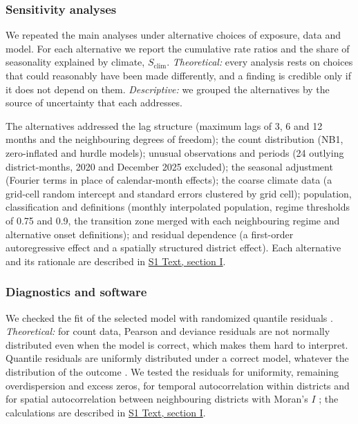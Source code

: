 \documentclass[11pt,a4paper]{article}
\begin{document}
\subsubsection{Sensitivity analyses}

We repeated the main analyses under alternative choices of exposure, data and model. For each alternative we report the cumulative rate ratios and the share of seasonality explained by climate, \(S_{\text{clim}}\). \emph{Theoretical:} every analysis rests on choices that could reasonably have been made differently, and a finding is credible only if it does not depend on them. \emph{Descriptive:} we grouped the alternatives by the source of uncertainty that each addresses.

The alternatives addressed the lag structure (maximum lags of 3, 6 and 12 months and the neighbouring degrees of freedom); the count distribution (NB1, zero-inflated and hurdle models); unusual observations and periods (24 outlying district-months, 2020 and December 2025 excluded); the seasonal adjustment (Fourier terms in place of calendar-month effects); the coarse climate data (a grid-cell random intercept and standard errors clustered by grid cell); population, classification and definitions (monthly interpolated population, regime thresholds of 0.75 and 0.9, the transition zone merged with each neighbouring regime and alternative onset definitions); and residual dependence (a first-order autoregressive effect and a spatially structured district effect). Each alternative and its rationale are described in \hyperref[s1text-i]{S1 Text, section I}.

\subsubsection{Diagnostics and software}

We checked the fit of the selected model with randomized quantile residuals \cite{ref48}. \emph{Theoretical:} for count data, Pearson and deviance residuals are not normally distributed even when the model is correct, which makes them hard to interpret. Quantile residuals are uniformly distributed under a correct model, whatever the distribution of the outcome \cite{ref48}. We tested the residuals for uniformity, remaining overdispersion and excess zeros, for temporal autocorrelation within districts and for spatial autocorrelation between neighbouring districts with Moran's \(I\) \cite{ref49}; the calculations are described in \hyperref[s1text-i]{S1 Text, section I}.
\end{document}

